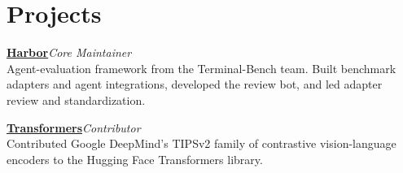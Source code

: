 \documentclass[11pt,a4paper]{article}
\newcommand{\project}[4]{%
  \textbf{#1}\hspace{0.5em}{\small\color{accent}#2}\hfill\textit{#3}\\#4\par\vspace{0.2ex}%
}
\begin{document}
\section{Projects}
\project{\href{https://github.com/harbor-framework/harbor}{Harbor}}{$\star$\,5.0k}{Core Maintainer}%
  {Agent-evaluation framework from the Terminal-Bench team. Built benchmark adapters and agent
   integrations, developed the review bot, and led adapter review and standardization.}
\project{\href{https://github.com/huggingface/transformers}{Transformers}}{$\star$\,165k}{Contributor}%
  {Contributed Google DeepMind's TIPSv2 family of contrastive vision-language encoders to the
   Hugging Face Transformers library.}

\end{document}
